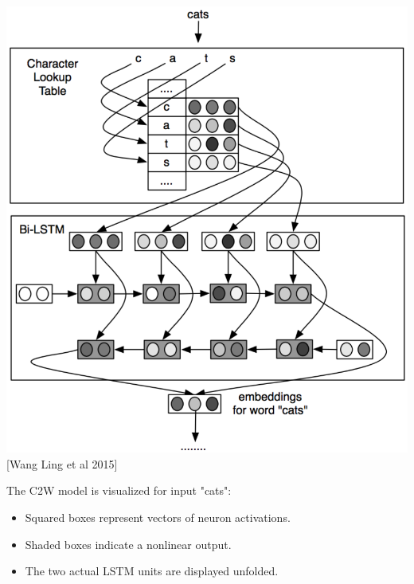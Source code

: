\documentclass[11pt, a4paper, landscape]{article}
\begin{document}
\begin{minipage}[c]{.5\linewidth}
  \begin{center}
    \includegraphics[width=\linewidth]{../article/img/bi-lstm-emeddings}\\
    {[}Wang Ling et al 2015{]}
  \end{center}
\end{minipage}
\begin{minipage}[c]{.5\linewidth}
The C2W model is visualized for input "cats":
  \begin{itemize}
  \item Squared boxes represent vectors of neuron activations.
  \item Shaded boxes indicate a nonlinear output.
  \item The two actual LSTM units are displayed unfolded.
  \end{itemize}
\end{minipage}

\NewPage{}
\end{document}

